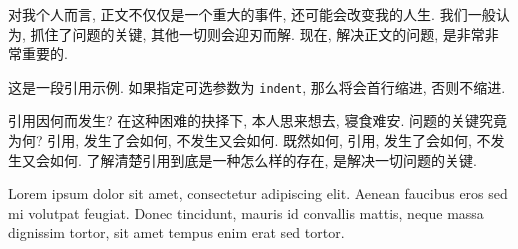 \documentclass[UTF8,no-math]{ctexart}
\numberwithin{enumi}{section}
\begin{document}
    对我个人而言, 正文不仅仅是一个重大的事件, 还可能会改变我的人生. 我们一般认为, 抓住了问题的关键, 其他一切则会迎刃而解. 现在, 解决正文的问题, 是非常非常重要的. 
    \begin{bdquote}[indent]
        这是一段引用示例. 如果指定可选参数为 \texttt{indent}, 那么将会首行缩进, 否则不缩进. 
        
        引用因何而发生? 在这种困难的抉择下, 本人思来想去, 寝食难安. 问题的关键究竟为何? 引用, 发生了会如何, 不发生又会如何. 既然如何, 引用, 发生了会如何, 不发生又会如何. 了解清楚引用到底是一种怎么样的存在, 是解决一切问题的关键. 
        
        Lorem ipsum dolor sit amet, consectetur adipiscing elit. Aenean faucibus eros sed mi volutpat feugiat. Donec tincidunt, mauris id convallis mattis, neque massa dignissim tortor, sit amet tempus enim erat sed tortor.
    \end{bdquote}
\end{document}

